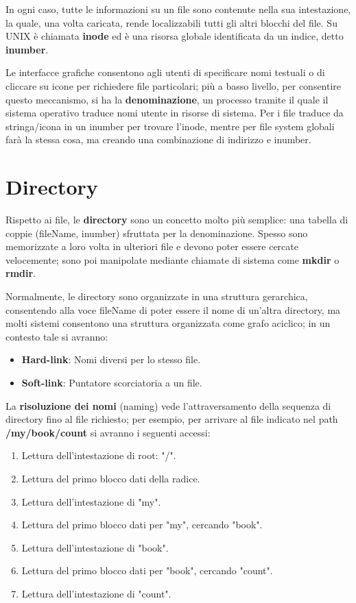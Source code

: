 \noindent In ogni caso, tutte le informazioni su un file sono contenute nella sua intestazione, la quale, una volta caricata, rende localizzabili tutti
gli altri blocchi del file. Su UNIX è chiamata \textbf{inode} ed è una risorsa globale identificata da un indice, detto \textbf{inumber}.\par
Le interfacce grafiche consentono agli utenti di specificare nomi testuali o di cliccare su icone per richiedere file particolari; più a basso livello,
per consentire questo meccanismo, si ha la \textbf{denominazione}, un processo tramite il quale il sistema operativo traduce nomi utente in risorse di
sistema. Per i file traduce da stringa/icona in un inumber per trovare l'inode, mentre per file system globali farà la stessa cosa, ma creando una
combinazione di indirizzo e inumber.

%

\section{Directory} %
Rispetto ai file, le \textbf{directory} sono un concetto molto più semplice: una tabella di coppie (fileName, inumber) sfruttata per la denominazione.
Spesso sono memorizzate a loro volta in ulteriori file e devono poter essere cercate velocemente; sono poi manipolate mediante chiamate di sistema come
\textbf{mkdir} o \textbf{rmdir}.\par
Normalmente, le directory sono organizzate in una struttura gerarchica, consentendo alla voce fileName di poter essere il nome di un'altra directory, ma
molti sistemi consentono una struttura organizzata come grafo aciclico; in un contesto tale si avranno: \begin{itemize}
    \item \textbf{Hard-link}: Nomi diversi per lo stesso file.
    \item \textbf{Soft-link}: Puntatore scorciatoria a un file.
\end{itemize}

\noindent La \textbf{risoluzione dei nomi} (naming) vede l'attraversamento della sequenza di directory fino al file richiesto; per esempio, per
arrivare al file indicato nel path \textbf{/my/book/count} si avranno i seguenti accessi: \begin{enumerate}
    \item Lettura dell'intestazione di root: "/".
    \item Lettura del primo blocco dati della radice.
    \item Lettura dell'intestazione di "my".
    \item Lettura del primo blocco dati per "my", cercando "book".
    \item Lettura dell'intestazione di "book".
    \item Lettura del primo blocco dati per "book", cercando "count".
    \item Lettura dell'intestazione di "count".
\end{enumerate}

